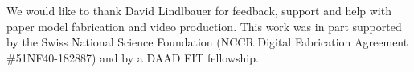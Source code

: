 \documentclass[acmtog]{acmart}
\begin{document}
\maketitle









\begin{acks}
  We would like to thank David Lindlbauer for feedback, support and help with paper model fabrication and video production. This work was in part supported by the Swiss National Science Foundation (NCCR Digital Fabrication Agreement \#51NF40-182887) and by a DAAD FIT fellowship. 
\end{acks}




% 
% 
% 
\end{document}
